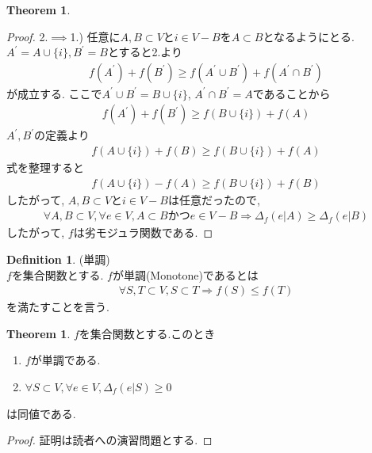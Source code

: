 \documentclass[11pt, a4paper, dvipdfmx]{jsarticle}
\theoremstyle{definition}
\newtheorem{Definition+}[Axiom+]{Definition}
\newtheorem{Theorem+}[Axiom+]{Theorem}
\begin{document}
\begin{Theorem+}
\begin{proof}
        2.$\implies$1.) 任意に$A, B\subset V$と$i\in V - B$を$A\subset B$となるようにとる. $A^{'} = A\cup \{i\}, B^{'} = B$とすると2.より
        \begin{align*}
            f(A^{'}) + f(B^{'})\geq f(A^{'}\cup B^{'}) + f(A^{'}\cap B^{'})
        \end{align*}
        が成立する. ここで$A^{'}\cup B^{'} = B\cup\{i\}$, $A^{'}\cap B^{'} = A$であることから
        \begin{align*}
            f(A^{'}) + f(B^{'})\geq f(B\cup\{i\}) + f(A)
        \end{align*}
        $A^{'}, B^{'}$の定義より
        \begin{align*}
            f(A\cup \{i\}) + f(B)\geq f(B\cup\{i\}) + f(A)
        \end{align*}
        式を整理すると
        \begin{align*}
            f(A\cup \{i\}) - f(A)\geq f(B\cup\{i\}) + f(B)
        \end{align*}
        したがって, $A, B\subset V$と$i\in V - B$は任意だったので,
        \begin{align*}
            \forall A, B\subset V, \forall e\in V,A\subset B かつe\in V - B\Longrightarrow \Delta_{f}(e | A)\geq\Delta_{f}(e | B)
        \end{align*}
        したがって, $f$は劣モジュラ関数である.
    \end{proof}
\end{Theorem+}
\begin{Definition+}(単調)\\
    $f$を集合関数とする. $f$が単調(Monotone)であるとは
    \begin{align*}
        \forall S, T\subset V, S\subset T\Longrightarrow f(S)\leq f(T)
    \end{align*}
    を満たすことを言う.
\end{Definition+}
\begin{Theorem+}
    $f$を集合関数とする.このとき
    \begin{enumerate}
        \item $f$が単調である.
        \item $\forall S\subset V, \forall e\in V, \Delta_{f}(e | S)\geq 0$
    \end{enumerate}
    は同値である.
    \begin{proof}
        証明は読者への演習問題とする.
    \end{proof}
\end{Theorem+}
\end{document}

